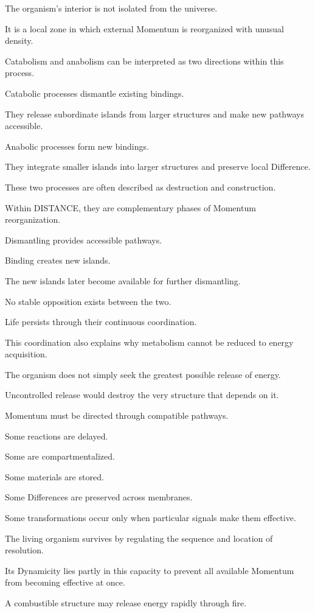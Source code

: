 The organism’s interior is not isolated from the universe.

It is a local zone in which external Momentum is reorganized with unusual density.

Catabolism and anabolism can be interpreted as two directions within this process.

Catabolic processes dismantle existing bindings.

They release subordinate islands from larger structures and make new pathways accessible.

Anabolic processes form new bindings.

They integrate smaller islands into larger structures and preserve local Difference.

These two processes are often described as destruction and construction.

Within DISTANCE, they are complementary phases of Momentum reorganization.

Dismantling provides accessible pathways.

Binding creates new islands.

The new islands later become available for further dismantling.

No stable opposition exists between the two.

Life persists through their continuous coordination.

This coordination also explains why metabolism cannot be reduced to energy acquisition.

The organism does not simply seek the greatest possible release of energy.

Uncontrolled release would destroy the very structure that depends on it.

Momentum must be directed through compatible pathways.

Some reactions are delayed.

Some are compartmentalized.

Some materials are stored.

Some Differences are preserved across membranes.

Some transformations occur only when particular signals make them effective.

The living organism survives by regulating the sequence and location of resolution.

Its Dynamicity lies partly in this capacity to prevent all available Momentum from becoming effective at once.

A combustible structure may release energy rapidly through fire.

